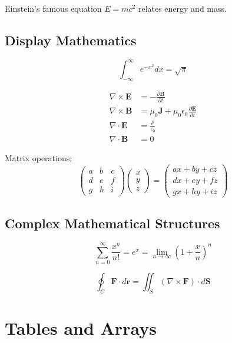 \documentclass[12pt]{article}
\begin{document}
Einstein's famous equation $E = mc^2$ relates energy and mass.

\subsection{Display Mathematics}
\begin{equation}
\int_{-\infty}^{\infty} e^{-x^2} dx = \sqrt{\pi}
\end{equation}

\begin{align}
\nabla \times \mathbf{E} &= -\frac{\partial \mathbf{B}}{\partial t} \\
\nabla \times \mathbf{B} &= \mu_0\mathbf{J} + \mu_0\epsilon_0\frac{\partial \mathbf{E}}{\partial t} \\
\nabla \cdot \mathbf{E} &= \frac{\rho}{\epsilon_0} \\
\nabla \cdot \mathbf{B} &= 0
\end{align}

Matrix operations:
\begin{equation}
\begin{pmatrix}
a & b & c \\
d & e & f \\
g & h & i
\end{pmatrix}
\begin{pmatrix}
x \\ y \\ z
\end{pmatrix}
=
\begin{pmatrix}
ax + by + cz \\
dx + ey + fz \\
gx + hy + iz
\end{pmatrix}
\end{equation}

\subsection{Complex Mathematical Structures}
\begin{equation}
\sum_{n=0}^{\infty} \frac{x^n}{n!} = e^x = \lim_{n \to \infty} \left(1 + \frac{x}{n}\right)^n
\end{equation}

\begin{equation}
\oint_C \mathbf{F} \cdot d\mathbf{r} = \iint_S (\nabla \times \mathbf{F}) \cdot d\mathbf{S}
\end{equation}

\section{Tables and Arrays}
\end{document}
